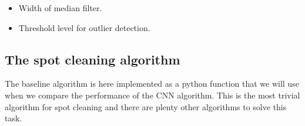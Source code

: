 \documentclass[letterpaper,10pt,english]{sphinxmanual}
\begin{document}
\begin{itemize}
\item {} 
 Width of median filter.

\item {} 
 Threshold level for outlier detection.

\end{itemize}


\subsection{The spot cleaning algorithm}
\label{\detokenize{ML4NeutronImageSegmentation:the-spot-cleaning-algorithm}}
The baseline algorithm is here implemented as a python function that we will use when we compare the performance of the CNN algorithm. This is the most trivial algorithm for spot cleaning and there are plenty other algorithms to solve this task.

\begin{sphinxVerbatim}[commandchars=\\\{\}]
   \PYG{p}{[}\PYG{p}{]} 
      
        
            
     
\end{sphinxVerbatim}
\end{document}
